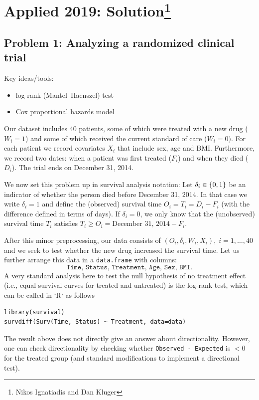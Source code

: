 \section{Applied 2019: Solution\footnote{Nikos Ignatiadis and Dan Kluger}}



\subsection*{Problem 1: Analyzing a randomized clinical trial}

Key ideas/tools:
\begin{itemize}
  \item log-rank (Mantel--Haenszel) test
  \item Cox proportional hazards model
\end{itemize}

Our dataset includes 40 patients, some of which were treated with a new drug ($W_i=1$) and some of which received the current standard of care ($W_i=0)$. For each patient we record covariates $X_i$ that include sex, age and BMI. Furthermore, we record two dates: when a patient was first treated ($F_i$) and when they died ($D_i$). The trial ends on December 31, 2014. 

We now set this problem up in survival analysis notation: Let $\delta_i \in \left\{0,1\right\}$ be an indicator of whether the person died before December 31, 2014. In that case we write $\delta_i=1$ and define the (observed) survival time $O_i=T_i = D_i - F_i$ (with the difference defined in terms of days). If $\delta_i =0$, we only know that the (unobserved) survival time $T_i$ satisfies  $T_i\geq O_i = \text{December 31, 2014} - F_i$.        

After this minor preprocessing, our data consists of $(O_i, \delta_i, W_i, X_i), \; i=1,\dotsc,40$ and we seek to test whether the new drug increased the survival time. Let us further arrange this data in a \texttt{data.frame} with columns: 
$$\texttt{Time, Status, Treatment, Age, Sex, BMI}.$$ 
A very standard analysis here to test the null hypothesis of no treatment effect (i.e., equal survival curves for treated and untreated) is the log-rank test, which can be called in `R` as follows
\begin{lstlisting}
library(survival)
survdiff(Surv(Time, Status) ~ Treatment, data=data)
\end{lstlisting}
The result above does not directly give an answer about directionality. However, one can check directionality by checking whether \texttt{Observed - Expected} is $<0$ for the treated group (and standard modifications to implement a directional test).

